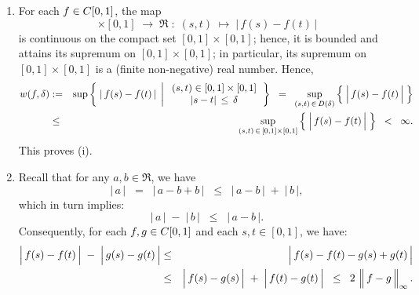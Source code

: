 \begin{enumerate}
\item	For each $f \in C[0,1]$, the map
		\begin{equation*}
		[0,1] \times [0,1] \;\longrightarrow\; \Re \;:\; (s,t) \;\longmapsto\; \vert\,f(s) - f(t) \,\vert
		\end{equation*}
		is continuous on the compact set $[0,1] \times [0,1]$;
		hence, it is bounded and attains its supremum on $[0,1] \times [0,1]$;
		in particular, its supremum on $[0,1] \times [0,1]$ is a (finite non-negative) real number.
		Hence,
		\begin{eqnarray*}
		w(f,\delta)
		&:=&
		\sup\left\{\;
			\left\vert\,f(s) - f(t)\,\right\vert
			\;\left\vert\;
			\begin{array}{c} (s,t) \in [0,1] \times [0,1] \\ \vert s - t \vert\,\leq\,\delta \end{array}
			\right.
		\right\}
		\;\; = \;\;
		\underset{(s,t)\,\in\,D(\delta)}{\sup}\left\{\;\left\vert\,\overset{{\color{white}.}}{f}(s) - f(t)\,\right\vert\;\right\}
		\\
		& \leq &
		\underset{(s,t)\,\in\,[0,1]\times[0,1]}{\sup}\left\{\;\left\vert\,\overset{{\color{white}.}}{f}(s) - f(t)\,\right\vert\;\right\}
		\;\; < \;\; \infty.
		\end{eqnarray*}
		This proves (i).
\item	Recall that for any $a, b \in \Re$, we have
		\begin{equation*}
		\vert\,a\,\vert
		\;\;=\;\; \vert\,a - b + b\,\vert
		\;\;\leq\;\; \vert\,a - b\,\vert \;+\; \vert\,b\,\vert,
		\end{equation*}
		which in turn implies:
		\begin{equation*}
		\vert\,a\,\vert \;-\; \vert\,b\,\vert \;\;\leq\;\; \vert\,a - b\,\vert.
		\end{equation*}
		Consequently, for each $f,g \in C[0,1]$ and each $s,t \in [0,1]$, we have:
		\begin{eqnarray*}
		\left\vert\, f(s) \overset{{\color{white}.}}{-} f(t)\,\right\vert
			\;-\; \left\vert\, g(s) \overset{{\color{white}.}}{-} g(t) \,\right\vert
		&\leq&
			\left\vert\,f(s)-f(t) \overset{{\color{white}.}}{-} g(s)+g(t)\,\right\vert	
		\\
		&\leq&
			\left\vert\,f(s) \overset{{\color{white}.}}{-} g(s)\,\right\vert
			\;+\;
			\left\vert\,f(t) \overset{{\color{white}.}}{-} g(t)\,\right\vert
		\;\;\leq\;\;
			2\,\left\Vert\,f \overset{{\color{white}.}}{-} g\,\right\Vert_{\infty}.
		\end{eqnarray*}

\end{enumerate}
